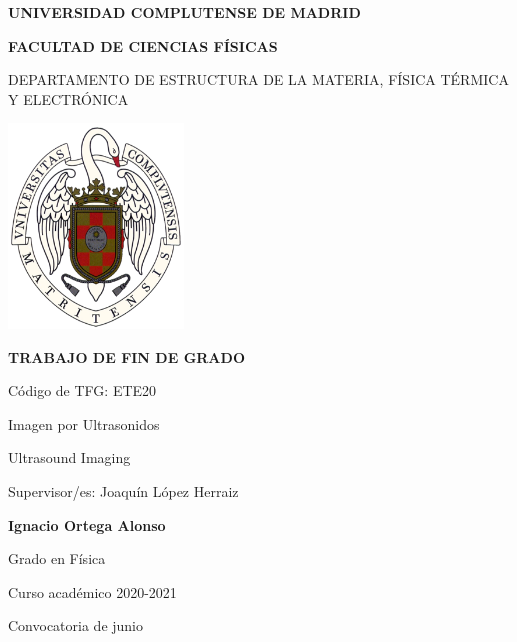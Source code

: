 \documentclass[12pt]{article} %
\begin{document}
\begin{titlepage}
\centering
{ \bfseries \Large UNIVERSIDAD COMPLUTENSE DE MADRID}
\vspace{0.5cm}

{\bfseries  \Large FACULTAD DE CIENCIAS FÍSICAS} 
\vspace{1cm}

{\large DEPARTAMENTO DE ESTRUCTURA DE LA MATERIA, FÍSICA TÉRMICA Y ELECTRÓNICA}
\vspace{0.8cm}

{\includegraphics[width=0.35\textwidth]{figuras/logoUCM.png}} %
\vspace{0.8cm}

{\bfseries \Large TRABAJO DE FIN DE GRADO}
\vspace{15mm}

{\Large Código de TFG:  ETE20 } \vspace{5mm}

{\Large Imagen por Ultrasonidos}\vspace{5mm}

{\Large Ultrasound Imaging}\vspace{5mm}

{\Large Supervisor/es: Joaquín López Herraiz}\vspace{18mm} 

{\bfseries \LARGE Ignacio Ortega Alonso}\vspace{5mm} 

{\large Grado en Física}\vspace{5mm} 

{\large Curso acad\'emico 2020-2021}\vspace{5mm} 

{\large Convocatoria de junio}\vspace{5mm} 

\end{titlepage}
\newpage
\end{document}

